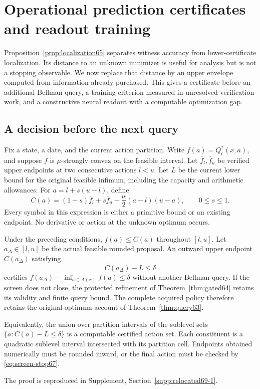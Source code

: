 \section{Operational prediction certificates and readout training}\label{sec:operational67}
Proposition~\ref{prop:localization65} separates witness accuracy from lower-certificate localization. Its distance to an unknown minimizer is useful for analysis but is not a stopping observable. We now replace that distance by an upper envelope computed from information already purchased. This gives a certificate before an additional Bellman query, a training criterion measured in unresolved verification work, and a constructive neural readout with a computable optimization gap.

\subsection{A decision before the next query}
Fix a state, a date, and the current action partition. Write $f(a)=Q_t^*(x,a)$, and suppose $f$ is $\mu$-strongly convex on the feasible interval. Let $\overline f_l,\overline f_u$ be verified upper endpoints at two consecutive actions $l<u$. Let $L$ be the current lower bound for the original feasible infimum, including the capacity and arithmetic allowances. For $a=l+s(u-l)$, define
\begin{equation}\label{eq:screen67}
 C(a)=(1-s)\overline f_l+s\overline f_u
       -\frac\mu2 (a-l)(u-a),\qquad 0\le s\le1.
\end{equation}
Every symbol in this expression is either a primitive bound or an existing endpoint. No derivative or action at the unknown optimum occurs.

\begin{theorem}\label{thm:screen67}
Under the preceding conditions, $f(a)\le C(a)$ throughout $[l,u]$. Let $a_\Delta\in[l,u]$ be the actual feasible rounded proposal. An outward upper endpoint $\overline C(a_\Delta)$ satisfying
\begin{equation}\label{eq:screen-stop67}
 \overline C(a_\Delta)-L\le\delta
\end{equation}
certifies $f(a_\Delta)-\inf_{a\in A(x)}f(a)\le\delta$ without another Bellman query. If the screen does not close, the protected refinement of Theorem~\ref{thm:gated64} retains its validity and finite query bound. The complete acquired policy therefore retains the original-optimum account of Theorem~\ref{thm:query63}.

Equivalently, the union over partition intervals of the sublevel sets $\{a:C(a)-L\le\delta\}$ is a computable certified action set. Each constituent is a quadratic sublevel interval intersected with its partition cell. Endpoints obtained numerically must be rounded inward, or the final action must be checked by \eqref{eq:screen-stop67}.
\end{theorem}
\noindent The proof is reproduced in Supplement, Section~\ref{supp:relocated69-1}.

